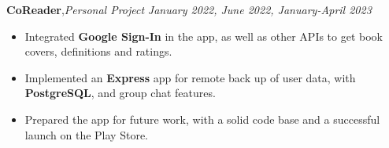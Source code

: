 \textbf{CoReader}\sep{\it Personal Project} \hfill{\sl \small January 2022, June 2022, January-April 2023}\\
\vspace{-8pt}
\begin{itemize}[itemsep = -1.7 mm, leftmargin=*]
\item Integrated {\bf Google Sign-In} in the app, as well as other APIs to get book covers, definitions and ratings.
\item Implemented an {\bf Express } app for remote back up of user data, with \textbf{PostgreSQL}, and group chat features.
\item Prepared the app for future work, with a solid code base and a successful launch on the Play Store.
\end{itemize}
